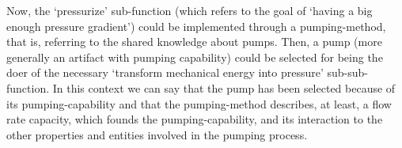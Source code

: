 \documentclass[sw]{iosart2x}
\newcommand{\bflist}{\begin{list}{}{\setlength{\topsep}{2mm}\setlength{\partopsep}{0mm}\setlength{\parsep}{0mm}\setlength{\leftmargin}{9mm}\setlength{\labelwidth}{8mm}}}
\newcommand{\eflist}{\end{list}}
\newcommand{\DefLabel}{\textrm{d}}
\newcounter{cntdef}
\newcommand{\mydf}[1]{\refstepcounter{cntdef}\begin{small}{\bf \DefLabel\thecntdef\label{def:#1}}\end{small}}
\newcommand{\generalStyle}[1]{\texttt{#1}}
\newcommand{\uniRel}[2]{\generalStyle{#1}(#2)}
\newcommand{\triRel}[4]{\generalStyle{#1}(#2,#3,#4)}
\newcommand{\myfi}{\hspace{0.9mm} \Longrightarrow}
\newcommand{\DOLCEProcess}[1]{\uniRel{PRO}{#1}}
\newcommand{\BehaviourConcrete}[1]{\uniRel{Behaviour}{#1}}
\newcommand{\participateAsDoer}[3]{\triRel{participatesAsDoer}{#1}{#2}{#3}}
\newcommand{\firstTimeKeyWord}[1]{\textit{#1}}
\begin{document}
Now, the `pressurize' sub-function (which refers to the goal of `having a big enough pressure gradient') could be implemented through a pumping-method, that is, referring to the shared knowledge about pumps.
Then, a pump (more generally an artifact with pumping capability) could be selected for being the doer of the necessary `transform mechanical energy into pressure' sub-sub-function.
In this context we can say that the pump has been selected because of its pumping-capability and that the pumping-method describes, at least, a flow rate capacity, which founds the pumping-capability, and its interaction to the other properties and entities involved in the pumping process. 









\end{document}
